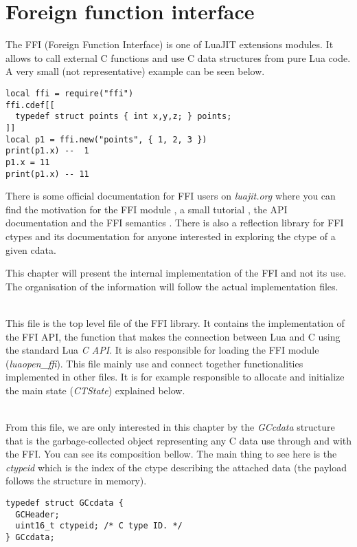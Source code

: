 
\section{Foreign function interface}
\label{Sec:FFI}


The FFI (Foreign Function Interface) is one of LuaJIT extensions modules. It
allows to call external C functions and use C data structures from pure Lua code.
A very small (not representative) example can be seen below.

\begin{lstlisting}[style=LuaStyle]
local ffi = require("ffi")
ffi.cdef[[
  typedef struct points { int x,y,z; } points;
]]
local p1 = ffi.new("points", { 1, 2, 3 })
print(p1.x) --  1
p1.x = 11
print(p1.x) -- 11
\end{lstlisting}
There is some official documentation for FFI users on \emph{luajit.org}
where you can find the motivation for the FFI module \cite{ffi-motivation},
a small tutorial \cite{ffi-tuto}, the API documentation \cite{ffi-api} and the
FFI semantics \cite{ffi-semantics}. There is also a reflection
library for FFI ctypes \cite{ffi-reflect} and its documentation
\cite{ffi-reflect-doc} for anyone interested in exploring the ctype of a given cdata.

This chapter will present the internal implementation of the FFI and not its use.
The organisation of the information will follow the actual implementation files.

\\
This file is the top level file of the FFI library. It contains the
implementation of the FFI API, the function that makes the connection between
Lua and C using the standard Lua \emph{C API}.
It is also responsible for loading the FFI module (\emph{luaopen\_ffi}).
This file mainly use and connect together functionalities implemented in other
files. It is for example responsible to allocate and initialize the main state
(\emph{CTState}) explained below.

\\
From this file, we are only interested in this chapter by the \emph{GCcdata}
structure that is the garbage-collected object representing any C data use
through and with the FFI. You can see its composition bellow. The main thing to
see here is the \emph{ctypeid} which is the index of the ctype describing the
attached data (the payload follows the structure in memory).
\begin{lstlisting}[style=CStyle]
typedef struct GCcdata {
  GCHeader;
  uint16_t ctypeid;	/* C type ID. */
} GCcdata;
\end{lstlisting}

